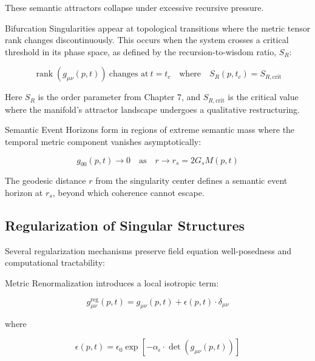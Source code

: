 These semantic attractors collapse under excessive recursive pressure.

Bifurcation Singularities appear at topological transitions where the metric tensor rank changes discontinuously. This occurs when the system crosses a critical threshold in its phase space, as defined by the recursion-to-wisdom ratio, \(S_R\):

\begin{equation}
\operatorname{rank}(g_{\mu\nu}(p, t)) \ \text{changes at} \ t = t_c \quad \text{where} \quad S_R(p, t_c) = S_{R, \text{crit}}
\end{equation}

Here \(S_R\) is the order parameter from Chapter 7, and \(S_{R, \text{crit}}\) is the critical value where the manifold's attractor landscape undergoes a qualitative restructuring.

Semantic Event Horizons form in regions of extreme semantic mass where the temporal metric component vanishes asymptotically:

\begin{equation}
g_{00}(p, t) \to 0 \quad \text{as} \quad r \to r_s = 2G_s M(p, t)
\end{equation}

The geodesic distance \(r\) from the singularity center defines a semantic event horizon at \(r_s\), beyond which coherence cannot escape.


\subsection{Regularization of Singular Structures}
\label{12.2.1:regularization_of_singular_structures}

Several regularization mechanisms preserve field equation well-posedness and computational tractability:

Metric Renormalization introduces a local isotropic term:

\begin{equation}
g_{\mu\nu}^{\text{reg}}(p, t) = g_{\mu\nu}(p, t) + \epsilon(p, t) \cdot \delta_{\mu\nu}
\end{equation}

where

\begin{equation}
\epsilon(p, t) = \epsilon_0 \exp\left[-\alpha_{\epsilon} \cdot \det(g_{\mu\nu}(p, t))\right]
\end{equation}

